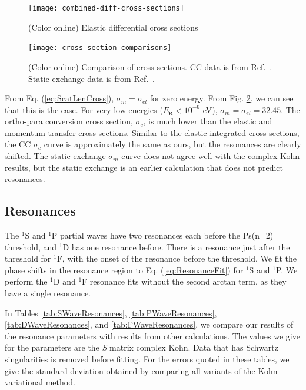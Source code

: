 \documentclass[reprint,showpacs,preprintnumbers,amsmath,amssymb,pra,aps]{revtex4-1}
\begin{document}
\begin{figure}[H]
	\centering
	\texttt{[image: combined-diff-cross-sections]}
	\caption{(Color online) Elastic differential cross sections}
	\label{fig:combined-diff-cross-sections}
\end{figure}

\begin{figure}[H]
	\centering
	\texttt{[image: cross-section-comparisons]}
	\caption{(Color online) Comparison of cross sections. CC data is from Ref.~\cite{Blackwood2002}. Static exchange data is from Ref.~\cite{Hara1975}.}
	\label{fig:cross-section-comparisons}
\end{figure}

From Eq. (\ref{eq:ScatLenCross}), $\sigma_m = \sigma_{el}$ for zero energy. From Fig. \ref{fig:cross-section-comparisons}, we can see that this is the case. For very low energies ($E_{\bm \kappa} < 10^{-6}$ eV), $\sigma_m = \sigma_{el} = 32.45$. The ortho-para conversion cross section, $\sigma_c$, is much lower than the elastic and momentum transfer cross sections. Similar to the elastic integrated cross sections, the CC $\sigma_c$ curve is approximately the same as ours, but the resonances are clearly shifted. The static exchange $\sigma_m$ curve does not agree well with the complex Kohn results, but the static exchange is an earlier calculation that does not predict resonances.

\subsection{Resonances}
\label{sec:Resonances}
The $^1$S and $^1$P partial waves have two resonances each before the Ps(n=2) threshold, and $^1$D has one resonance before. There is a resonance just after the threshold for $^1$F, with the onset of the resonance before the threshold. We fit the phase shifts in the resonance region to Eq. (\ref{eq:ResonanceFit}) for $^1$S and $^1$P. We perform the $^1$D and $^1$F resonance fits without the second arctan term, as they have a single resonance.

In Tables \ref{tab:SWaveResonances}, \ref{tab:PWaveResonances}, \ref{tab:DWaveResonances}, and \ref{tab:FWaveResonances}, we compare our results of the resonance parameters with results from other calculations. The values we give for the parameters are the \emph{S} matrix complex Kohn. Data that has Schwartz singularities is removed before fitting. For the errors quoted in these tables, we give the standard deviation obtained by comparing all variants of the Kohn variational method.
\end{document}
